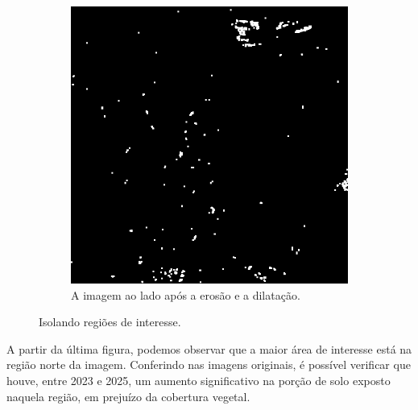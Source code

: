 \documentclass{article}
\begin{document}
\begin{figure}[H]
\begin{subfigure}[b]{0.48\textwidth}
        \includegraphics[width=\textwidth]{../Imagens/resultado01.png}
        \caption{A imagem ao lado após a erosão e a dilatação.}
        \label{2025}
    \end{subfigure}
    \caption{Isolando regiões de interesse.}
    \label{resultado}
\end{figure}

A partir da última figura, podemos observar que a maior área de interesse está na região norte da imagem. Conferindo nas imagens originais, é possível verificar que houve, entre 2023 e 2025, um aumento significativo na porção de solo exposto naquela região, em prejuízo da cobertura vegetal.
\end{document}
